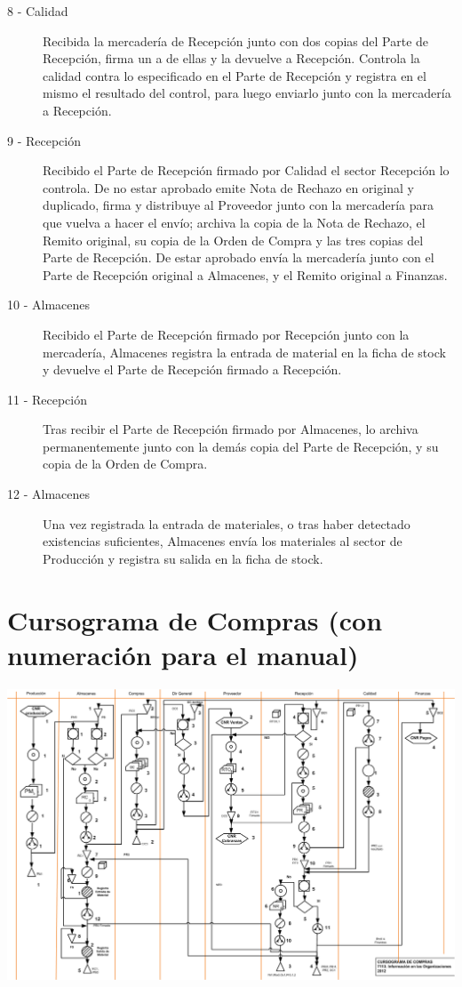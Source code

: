 \begin{description}
\item [8 - Calidad] Recibida la mercadería de Recepción junto con dos copias del Parte de Recepción, firma un a de ellas y la devuelve a Recepción. Controla la calidad contra lo especificado en el Parte de Recepción y registra en el mismo el resultado del control, para luego enviarlo junto con la mercadería a Recepción.
\item [9 - Recepción] Recibido el Parte de Recepción firmado por Calidad el sector Recepción lo controla. De no estar aprobado emite Nota de Rechazo en original y duplicado, firma y distribuye al Proveedor junto con la mercadería para que vuelva a hacer el envío; archiva la copia de la Nota de Rechazo, el Remito original, su copia de la Orden de Compra y las tres copias del Parte de Recepción. De estar aprobado envía la mercadería junto con el Parte de Recepción original a Almacenes, y el Remito original a Finanzas.
\item [10 - Almacenes] Recibido el Parte de Recepción firmado por Recepción junto con la mercadería, Almacenes registra la entrada de material en la ficha de stock y devuelve el Parte de Recepción firmado a Recepción.
\item [11 - Recepción] Tras recibir el Parte de Recepción firmado por Almacenes, lo archiva permanentemente junto con la demás copia del Parte de Recepción, y su copia de la Orden de Compra.
\item [12 - Almacenes] Una vez registrada la entrada de materiales, o tras haber detectado existencias suficientes, Almacenes envía los materiales al sector de Producción y registra su salida en la ficha de stock.
\end{description}

\pagebreak
\section{Cursograma de Compras (con numeración para el manual)}
\includegraphics [scale=0.5 ,angle=90]{Empresa/Circuitos/Compras/Compras-manual.png}


